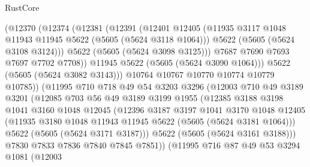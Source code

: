 \begin{lexlean}{RustCore}
\begin{coremodule}
                      (@12370
                        (@12374
                          (@12381
                            (@12391
                              (@12401
                                @12405
                                (@11935 @3117 @1048 @11943 @11945 @5622 (@5605 (@5624 @3118 @1064)))
                                @5622
                                (@5605 (@5624 @3108 @3124)))
                              @5622
                              (@5605 (@5624 @3098 @3125)))
                            @7687
                            @7690
                            @7693
                            @7697
                            @7702
                            @7708))
                        @11945
                        @5622
                        (@5605 (@5624 @3090 @1064)))
                      @5622
                      (@5605 (@5624 @3082 @3143)))
                    @10764
                    @10767
                    @10770
                    @10774
                    @10779
                    @10785))
                (@11995
                  @710
                  @718
                  @49
                  @54
                  @3203
                  @3296
                  (@12003
                    @710
                    @49
                    @3189
                    @3201
                    (@12085
                      @703
                      @56
                      @49
                      @3189
                      @3199
                      @1955
                      (@12385
                        @3188
                        @3198
                        @1041
                        @3160
                        @1048
                        @12045
                        (@12396
                          @3187
                          @3197
                          @1041
                          @3170
                          @1048
                          @12405
                          (@11935 @3180 @1048 @11943 @11945 @5622 (@5605 (@5624 @3181 @1064)))
                          @5622
                          (@5605 (@5624 @3171 @3187)))
                        @5622
                        (@5605 (@5624 @3161 @3188)))
                      @7830
                      @7833
                      @7836
                      @7840
                      @7845
                      @7851))
                  (@11995
                    @716
                    @87
                    @49
                    @53
                    @3294
                    @1081
                    (@12003

\end{coremodule}
\end{lexlean}
